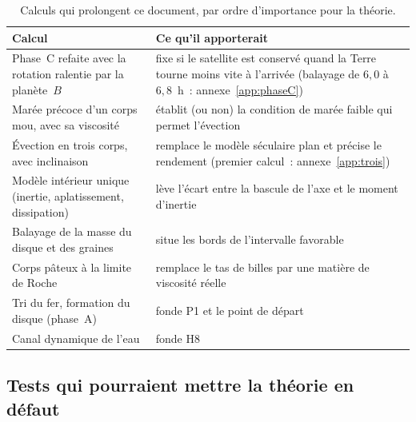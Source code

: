 \documentclass[11pt,a4paper]{article}
\begin{document}
\begin{table}[htbp]
\centering
\caption{Calculs qui prolongent ce document, par ordre d'importance pour la théorie.\label{tab:programme}}
\small
\begin{tabular}{>{\raggedright\arraybackslash}p{5.4cm}>{\raggedright\arraybackslash}p{9.4cm}}
\toprule
Calcul & Ce qu'il apporterait \\
\midrule
Phase~C refaite avec la rotation ralentie par la planète~$B$ & fixe si le satellite est conservé quand la Terre tourne moins vite à l'arrivée (balayage de $6{,}0$ à $6{,}8$~h~: annexe~\ref{app:phaseC}) \\
Marée précoce d'un corps mou, avec sa viscosité & établit (ou non) la condition de marée faible qui permet l'évection \\
Évection en trois corps, avec inclinaison & remplace le modèle séculaire plan et précise le rendement (premier calcul~: annexe~\ref{app:trois}) \\
Modèle intérieur unique (inertie, aplatissement, dissipation) & lève l'écart entre la bascule de l'axe et le moment d'inertie \\
Balayage de la masse du disque et des graines & situe les bords de l'intervalle favorable \\
Corps pâteux à la limite de Roche & remplace le tas de billes par une matière de viscosité réelle \\
Tri du fer, formation du disque (phase~A) & fonde P1 et le point de départ \\
Canal dynamique de l'eau & fonde H8 \\
\bottomrule
\end{tabular}
\end{table}

\subsection{Tests qui pourraient mettre la théorie en défaut}
\end{document}
